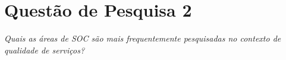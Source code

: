 \section{Questão de Pesquisa 2}

\emph{Quais as áreas de SOC são mais frequentemente pesquisadas no contexto de qualidade de serviços?}

